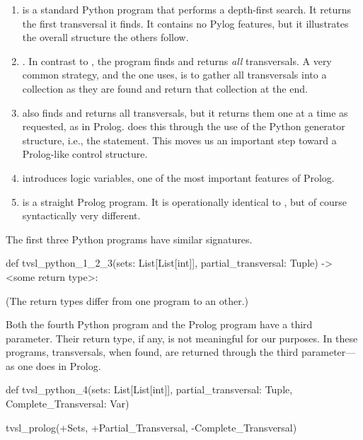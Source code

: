 \begin{enumerate}
\item {} is a standard Python program that performs a depth-first search. It returns the first transversal it finds. It contains no Pylog features, but it illustrates the overall structure the others follow. 
\item {}. In contrast to , the program  finds and returns \textit{all} transversals. A very common strategy, and the one  uses, is to gather all transversals into a collection as they are found and return that collection at the end.

\item {} also finds and returns all transversals, but it returns them one at a time as requested, as in Prolog.  does this through the use of the Python generator structure, i.e., the  statement. This moves us an important step toward a Prolog-like control structure.
\smallv
\item {} introduces logic variables, one of the most important features of Prolog.  
\item {} is a straight Prolog program. It is operationally identical to , but of course syntactically very different. 
\end{enumerate}

The first three Python programs have similar signatures. 

\begin{python}
def tvsl_python_1_2_3(sets: List[List[int]], partial_transversal: Tuple) -> <some return type>: 
\end{python}
(The return types differ from one program to an other.)

Both the fourth Python program and the Prolog program have a third parameter. Their return type, if any, is not meaningful for our purposes. In these programs, transversals, when found, are returned through the third parameter---as one does in Prolog.

\begin{python}
def tvsl_python_4(sets: List[List[int]], partial_transversal: Tuple, Complete_Transversal: Var)
\end{python}

\begin{python}
tvsl_prolog(+Sets, +Partial_Transversal, -Complete_Transversal)
\end{python}

